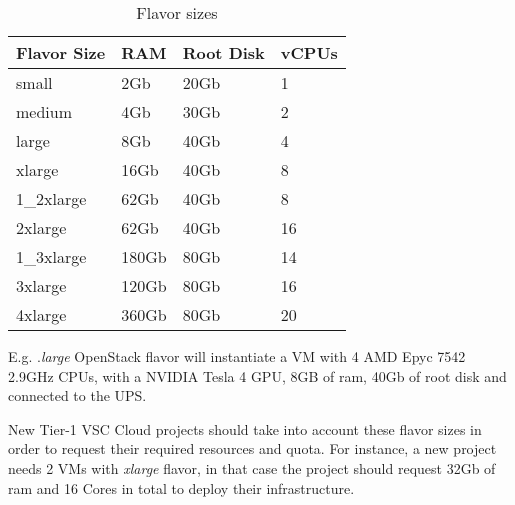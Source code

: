 \begin{table}[h!]
\centering
\begin{tabular}{ |p{3cm}|p{3cm}|p{3cm}|p{3cm}| }
  \hline
  \rowcolor{lightgray} \textbf{Flavor Size} & \textbf{RAM} & \textbf{Root Disk} & \textbf{vCPUs} \\
  \hline
  small & 2Gb & 20Gb & 1 \\
  \hline
  medium & 4Gb & 30Gb & 2 \\
  \hline
  large & 8Gb & 40Gb & 4 \\
  \hline
  xlarge & 16Gb & 40Gb & 8 \\
  \hline
  1\_2xlarge & 62Gb & 40Gb & 8 \\
  \hline
  2xlarge & 62Gb & 40Gb & 16 \\
  \hline
  1\_3xlarge & 180Gb & 80Gb & 14 \\
  \hline
  3xlarge & 120Gb & 80Gb & 16 \\
  \hline
  4xlarge & 360Gb & 80Gb & 20 \\
  \hline
\end{tabular}
\caption{Flavor sizes}
\label{table:flavor-size}
\end{table}

E.g. .\emph{large} OpenStack flavor will instantiate a
VM with 4 AMD Epyc 7542 2.9GHz CPUs, with a NVIDIA Tesla 4 GPU, 8GB
of ram, 40Gb of root disk and connected to the UPS.

 New Tier-1 VSC Cloud projects should take into account
these flavor sizes in order to request their required resources and quota.
For instance, a new project needs 2 VMs with \emph{xlarge} flavor,
in that case the project should request 32Gb of ram and 16 Cores in total
to deploy their infrastructure.

